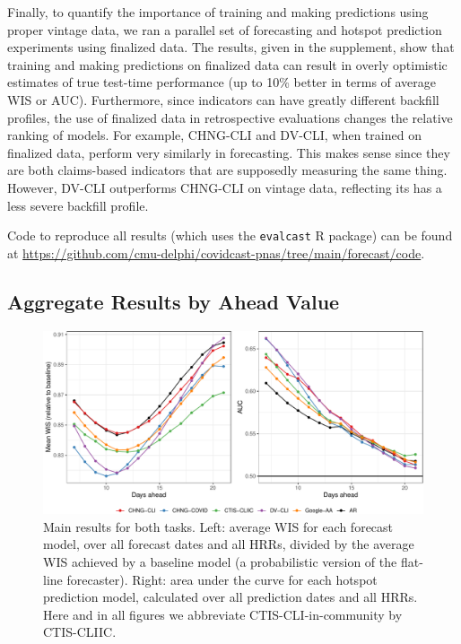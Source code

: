 \documentclass[9pt,twocolumn,twoside,lineno]{pnas-new}
\begin{document}
Finally, to quantify the importance of training and making predictions using
proper vintage data, we ran a parallel set of forecasting and hotspot prediction 
experiments using finalized data. The results, given in the supplement, show
that training and making predictions on finalized data can result in overly
optimistic estimates of true test-time performance (up to 10\% better in terms
of average WIS or AUC). Furthermore, since indicators can have greatly different
backfill profiles, the use of finalized data in retrospective evaluations
changes the relative ranking of models.  For example, CHNG-CLI and DV-CLI,
when trained on finalized data, perform very similarly in forecasting.
This makes sense since they are both claims-based indicators that are supposedly
measuring the same thing.  However, DV-CLI outperforms CHNG-CLI on vintage
data, reflecting its has a less severe backfill profile. 

Code to reproduce all results (which uses the \texttt{evalcast} R package) can 
be found at
\url{https://github.com/cmu-delphi/covidcast-pnas/tree/main/forecast/code}. 

\subsection{Aggregate Results by Ahead Value}

\begin{figure}[t]
  \includegraphics[width=\textwidth]{fig/fcast-hot-combo-1.pdf}
  \caption{Main results for both tasks. Left: average WIS for each forecast
    model, over all forecast dates and all HRRs, divided by the average WIS
    achieved by a baseline model (a probabilistic version of the flat-line
    forecaster).  Right: area under the curve for each hotspot prediction model,
    calculated over all prediction dates and all HRRs.  Here and in all figures
    we abbreviate CTIS-CLI-in-community by CTIS-CLIIC.  
  }  
  \label{fig:forecast}
\end{figure}
\end{document}
